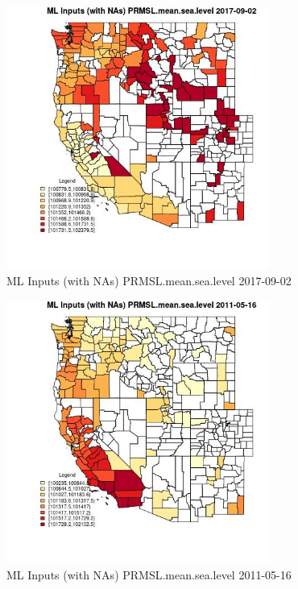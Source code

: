 \begin{figure} 
\centering  
\includegraphics[width=0.77\textwidth]{Code_Outputs/Report_ML_input_PM25_Step4_part_e_de_duplicated_aves_compiled_2019-05-21wNAs_CountyPRMSLmeansealevelMean2017-09-02.jpg} 
\caption{\label{fig:Report_ML_input_PM25_Step4_part_e_de_duplicated_aves_compiled_2019-05-21wNAsCountyPRMSLmeansealevelMean2017-09-02}ML Inputs (with NAs) PRMSL.mean.sea.level 2017-09-02} 
\end{figure} 
 

\begin{figure} 
\centering  
\includegraphics[width=0.77\textwidth]{Code_Outputs/Report_ML_input_PM25_Step4_part_e_de_duplicated_aves_compiled_2019-05-21wNAs_CountyPRMSLmeansealevelMean2011-05-16.jpg} 
\caption{\label{fig:Report_ML_input_PM25_Step4_part_e_de_duplicated_aves_compiled_2019-05-21wNAsCountyPRMSLmeansealevelMean2011-05-16}ML Inputs (with NAs) PRMSL.mean.sea.level 2011-05-16} 
\end{figure} 
 

